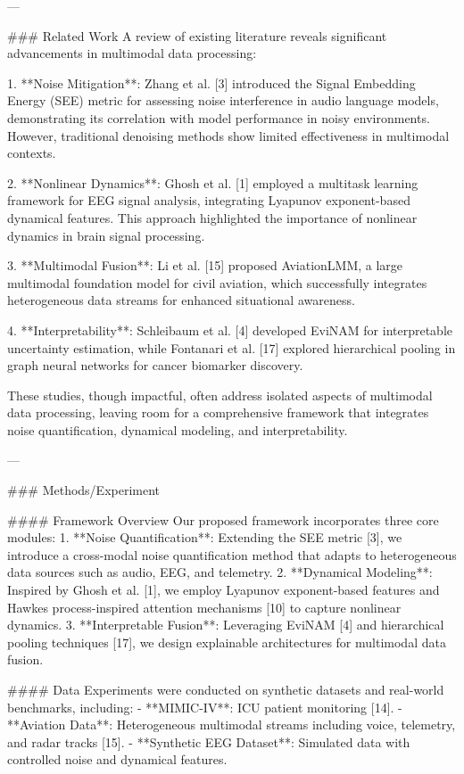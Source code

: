 ---

### Related Work  
A review of existing literature reveals significant advancements in multimodal data processing:

1. **Noise Mitigation**: Zhang et al. [3] introduced the Signal Embedding Energy (SEE) metric for assessing noise interference in audio language models, demonstrating its correlation with model performance in noisy environments. However, traditional denoising methods show limited effectiveness in multimodal contexts.

2. **Nonlinear Dynamics**: Ghosh et al. [1] employed a multitask learning framework for EEG signal analysis, integrating Lyapunov exponent-based dynamical features. This approach highlighted the importance of nonlinear dynamics in brain signal processing.

3. **Multimodal Fusion**: Li et al. [15] proposed AviationLMM, a large multimodal foundation model for civil aviation, which successfully integrates heterogeneous data streams for enhanced situational awareness.

4. **Interpretability**: Schleibaum et al. [4] developed EviNAM for interpretable uncertainty estimation, while Fontanari et al. [17] explored hierarchical pooling in graph neural networks for cancer biomarker discovery.

These studies, though impactful, often address isolated aspects of multimodal data processing, leaving room for a comprehensive framework that integrates noise quantification, dynamical modeling, and interpretability.

---

### Methods/Experiment  

#### Framework Overview  
Our proposed framework incorporates three core modules:  
1. **Noise Quantification**: Extending the SEE metric [3], we introduce a cross-modal noise quantification method that adapts to heterogeneous data sources such as audio, EEG, and telemetry.  
2. **Dynamical Modeling**: Inspired by Ghosh et al. [1], we employ Lyapunov exponent-based features and Hawkes process-inspired attention mechanisms [10] to capture nonlinear dynamics.  
3. **Interpretable Fusion**: Leveraging EviNAM [4] and hierarchical pooling techniques [17], we design explainable architectures for multimodal data fusion.

#### Data  
Experiments were conducted on synthetic datasets and real-world benchmarks, including:  
- **MIMIC-IV**: ICU patient monitoring [14].  
- **Aviation Data**: Heterogeneous multimodal streams including voice, telemetry, and radar tracks [15].  
- **Synthetic EEG Dataset**: Simulated data with controlled noise and dynamical features.

